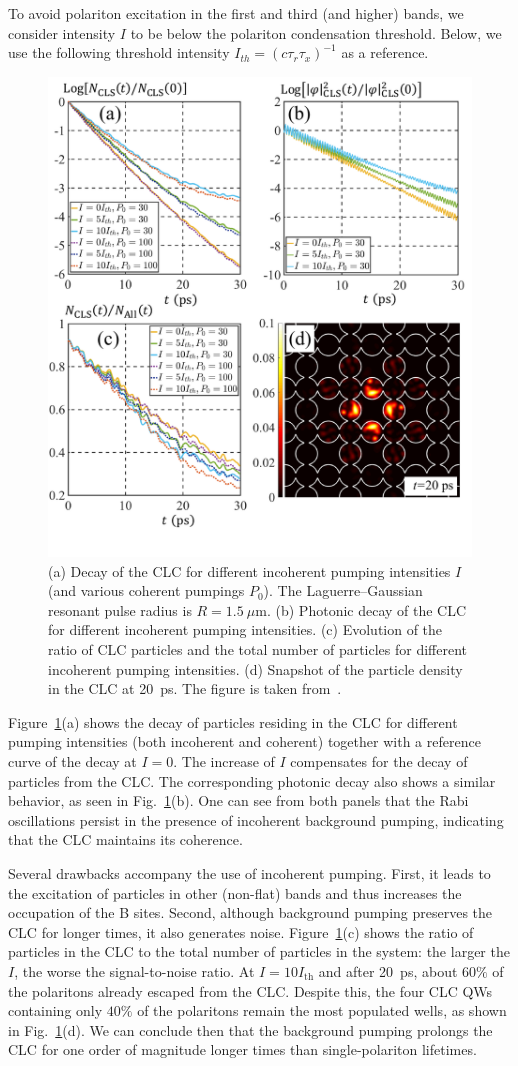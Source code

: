 To avoid polariton excitation in the first and third (and higher) bands, we consider intensity $I$ to be below the polariton condensation threshold.
Below, we use the following threshold intensity $I_{th}=(c\tau_r \tau_x)^{-1}$ as a reference.
%
%
%
\begin{figure}[ht]
\centering
\includegraphics[width=0.55\linewidth]{Fig/Ch3/pic3.pdf}
\caption[CLC with incoherent pumping]{(a) Decay of the CLC for different incoherent pumping intensities $I$ (and various coherent pumpings $P_0$). The Laguerre--Gaussian resonant pulse radius is $R=1.5~\mu$m. (b) Photonic decay of the CLC for different incoherent pumping intensities. (c) Evolution of the ratio of CLC particles and the total number of particles for different incoherent pumping intensities. (d) Snapshot of the particle density in the CLC at 20~ps. The figure is taken from~\cite{Sun:2018aa}.}
\label{fig:CH3_3}
\end{figure}
%
%
%

Figure~\ref{fig:CH3_3}(a) shows the decay of particles residing in the CLC for different pumping intensities (both incoherent and coherent) together with a reference curve of the decay at $I=0$.
The increase of $I$ compensates for the decay of particles from the CLC.
The corresponding photonic decay also shows a similar behavior, as seen in Fig.~\ref{fig:CH3_3}(b).
One can see from both panels that the Rabi oscillations persist in the presence of incoherent background pumping, indicating that the CLC maintains its coherence.

Several drawbacks accompany the use of incoherent pumping.
First, it leads to the excitation of particles in other (non-flat) bands and thus increases the occupation of the B sites. Second, although background pumping preserves the CLC for longer times, it also generates noise.
Figure~\ref{fig:CH3_3}(c) shows the ratio of particles in the CLC to the total number of particles in the system: the larger the $I$, the worse the signal-to-noise ratio.
At $I=10I_\mathrm{th}$ and after 20~ps, about $60\%$ of the polaritons already escaped from the CLC.
Despite this, the four CLC QWs containing only $40\%$ of the polaritons remain the most populated wells, as shown in Fig.~\ref{fig:CH3_3}(d).
We can conclude then that the background pumping prolongs the CLC for one order of magnitude longer times than single-polariton lifetimes.

